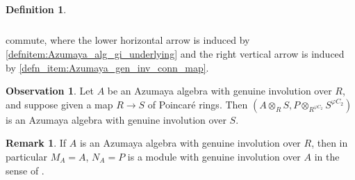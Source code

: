 \documentclass{article}
\newcommand{\op}{\mathrm{op}} %
\theoremstyle{definition}
\newtheorem{definition}[equation]{Definition}
\newtheorem{remark}[equation]{Remark}
\newtheorem{observation}[equation]{Observation}
\begin{document}
\begin{definition}
\begin{enumerate}[label=(\alph*)]
\begin{equation*}
\begin{tikzcd}
        \end{tikzcd}    
        \end{equation*}
        commute, where the lower horizontal arrow is induced by \ref{defnitem:Azumaya_alg_gi_underlying} and the right vertical arrow is induced by \ref{defn_item:Azumaya_gen_inv_conn_map}. 
    \end{enumerate}
\end{definition}
\begin{observation}\label{obs:azumaya_geninv_base_change}
    Let $ A $ be an Azumaya algebra with genuine involution over $ R $, and suppose given a map $ R \to S $ of Poincaré rings. 
    Then $ (A \otimes_R S, P \otimes_{R^{\varphi C_2}} S^{\varphi C_2}) $ is an Azumaya algebra with genuine involution over $ S $. 
\end{observation}
\begin{remark}\label{rmk:azumaya_geninv_gives_module_geninv}
    If $ A $ is an Azumaya algebra with genuine involution over $ R $, then in particular $ M_A = A $, $ N_A = P $ is a module with genuine involution over $ A $ in the sense of \cite[Definition 3.2.3]{CDHHLMNNSI}. 
\end{remark}
\end{document}
